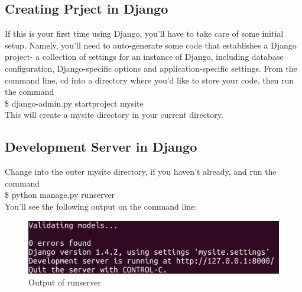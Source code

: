 \subsection{Creating Prject in Django}
If this is your first time using Django, you'll have to take care of 
some initial setup. Namely, you'll need to auto-generate some code that 
establishes a Django project- a collection of settings for an instance 
of Django, including database configuration, Django-specific options 
and application-specific settings. From the command line, cd into a 
directory where you'd like to store your code, then run the command \\

	\$ django-admin.py startproject mysite \\

\noindent This will create a mysite directory in your current
directory.


\subsection{Development Server in Django}  Change into 
the outer mysite directory, if you haven't already, and run the command\\
	
	\$ python manage.py runserver\\

You'll see the following output on the command line:\\

\begin{figure}[h]
\centering \includegraphics[scale=0.5]{images/out.jpg}
\caption{Output of runserver}
\end{figure}

